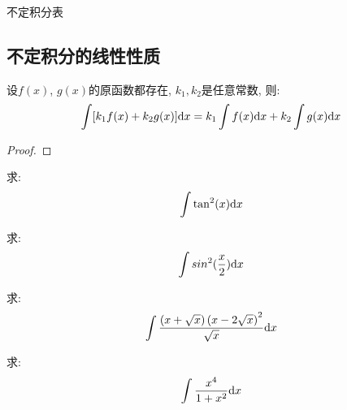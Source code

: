 不定积分表

\subsection{不定积分的线性性质}
\begin{theorem}[不定积分的线性性质]
    设$f(x)$, $g(x)$的原函数都存在, $k_1, k_2$是任意常数, 则:
    \begin{equation*}
        \int [k_1 f(x) + k_2 g(x)] \mathrm{d} x = k_1 \int f(x) \mathrm{d} x + k_2 \int g(x) \mathrm{d} x
    \end{equation*}
\end{theorem}
\begin{proof}
    
\end{proof}

\begin{example}
    求:
    \begin{equation*}
        \int \tan^2(x) \mathrm{d} x
    \end{equation*}
\end{example}
\begin{solution}
    
\end{solution}

\begin{example}
    求:
    \begin{equation*}
        \int sin^2(\frac{x}{2}) \mathrm{d} x
    \end{equation*}
\end{example}
\begin{solution}
    
\end{solution}

\begin{example}
    求:
    \begin{equation*}
        \int \frac{\left(x+\sqrt{x}\right)\left(x-2\sqrt{x}\right)^2}{\sqrt{x}} \mathrm{d} x
    \end{equation*}
\end{example}
\begin{solution}
    
\end{solution}

\begin{example}
    求:
    \begin{equation*}
        \int \frac{x^4}{1+x^2} \mathrm{d} x
    \end{equation*}
\end{example}

